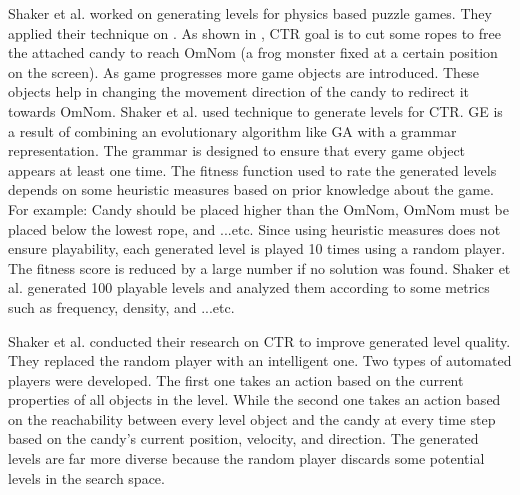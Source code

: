 Shaker et al.\cite{ctrAutomaticGeneration} worked on generating levels for physics based puzzle games. They applied their technique on . As shown in , CTR goal is to cut some ropes to free the attached candy to reach OmNom (a frog monster fixed at a certain position on the screen). As game progresses more game objects are introduced. These objects help in changing the movement direction of the candy to redirect it towards OmNom. Shaker et al. used  technique to generate levels for CTR. GE is a result of combining an evolutionary algorithm like GA with a grammar representation. The grammar is designed to ensure that every game object appears at least one time. The fitness function used to rate the generated levels depends on some heuristic measures based on prior knowledge about the game. For example: Candy should be placed higher than the OmNom, OmNom must be placed below the lowest rope, and ...etc. Since using heuristic measures does not ensure playability, each generated level is played 10 times using a random player. The fitness score is reduced by a large number if no solution was found. Shaker et al. generated 100 playable levels and analyzed them according to some metrics such as frequency, density, and ...etc.\\\par

Shaker et al.\cite{ctrSimulationApproach} conducted their research on CTR to improve generated level quality. They replaced the random player with an intelligent one. Two types of automated players were developed. The first one takes an action based on the current properties of all objects in the level. While the second one takes an action based on the reachability between every level object and the candy at every time step based on the candy's current position, velocity, and direction. The generated levels are far more diverse because the random player discards some potential levels in the search space.\\\par

